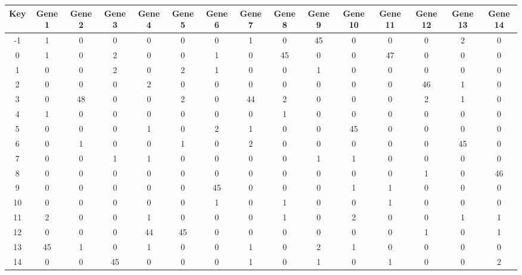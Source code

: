 \begin{tabular}{|c|c|c|c|c|c|c|c|c|c|c|c|c|c|c|}
\hline
Key & Gene 1 & Gene 2 & Gene 3 & Gene 4 & Gene 5 & Gene 6 & Gene 7 & Gene 8 & Gene 9 & Gene 10 & Gene 11 & Gene 12 & Gene 13 & Gene 14 \\
\hline
-1 & 1 & 0 & 0 & 0 & 0 & 0 & 1 & 0 & 45 & 0 & 0 & 0 & 2 & 0 \\
0 & 1 & 0 & 2 & 0 & 0 & 1 & 0 & 45 & 0 & 0 & 47 & 0 & 0 & 0 \\
1 & 0 & 0 & 2 & 0 & 2 & 1 & 0 & 0 & 1 & 0 & 0 & 0 & 0 & 0 \\
2 & 0 & 0 & 0 & 2 & 0 & 0 & 0 & 0 & 0 & 0 & 0 & 46 & 1 & 0 \\
3 & 0 & 48 & 0 & 0 & 2 & 0 & 44 & 2 & 0 & 0 & 0 & 2 & 1 & 0 \\
4 & 1 & 0 & 0 & 0 & 0 & 0 & 0 & 1 & 0 & 0 & 0 & 0 & 0 & 0 \\
5 & 0 & 0 & 0 & 1 & 0 & 2 & 1 & 0 & 0 & 45 & 0 & 0 & 0 & 0 \\
6 & 0 & 1 & 0 & 0 & 1 & 0 & 2 & 0 & 0 & 0 & 0 & 0 & 45 & 0 \\
7 & 0 & 0 & 1 & 1 & 0 & 0 & 0 & 0 & 1 & 1 & 0 & 0 & 0 & 0 \\
8 & 0 & 0 & 0 & 0 & 0 & 0 & 0 & 0 & 0 & 0 & 0 & 1 & 0 & 46 \\
9 & 0 & 0 & 0 & 0 & 0 & 45 & 0 & 0 & 0 & 1 & 1 & 0 & 0 & 0 \\
10 & 0 & 0 & 0 & 0 & 0 & 1 & 0 & 1 & 0 & 0 & 1 & 0 & 0 & 0 \\
11 & 2 & 0 & 0 & 1 & 0 & 0 & 0 & 1 & 0 & 2 & 0 & 0 & 1 & 1 \\
12 & 0 & 0 & 0 & 44 & 45 & 0 & 0 & 0 & 0 & 0 & 0 & 1 & 0 & 1 \\
13 & 45 & 1 & 0 & 1 & 0 & 0 & 1 & 0 & 2 & 1 & 0 & 0 & 0 & 0 \\
14 & 0 & 0 & 45 & 0 & 0 & 0 & 1 & 0 & 1 & 0 & 1 & 0 & 0 & 2 \\
\hline
\end{tabular}